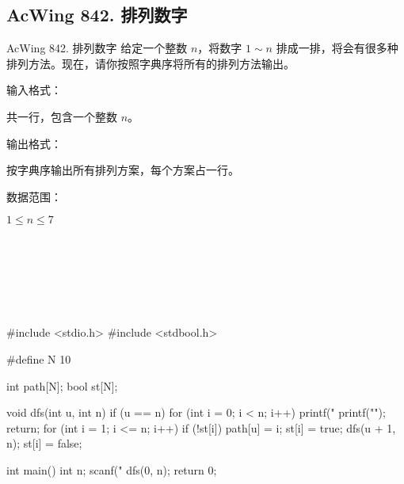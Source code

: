 \subsection{AcWing 842. 排列数字}
\begin{titledbox}{AcWing 842. 排列数字}
    给定一个整数 $n$，将数字 $1 \sim n$ 排成一排，将会有很多种排列方法。现在，请你按照字典序将所有的排列方法输出。

    输入格式：

    共一行，包含一个整数 $n$。

    输出格式：

    按字典序输出所有排列方案，每个方案占一行。

    数据范围：

    $1 \le n \le 7$

    \begin{inputblock}
    \end{inputblock}
    \begin{outputblock}
         \\
         \\
         \\
         \\
         \\
    \end{outputblock}
\end{titledbox}

\begin{mycpptwocol}[排列数字]
    #include <stdio.h>
    #include <stdbool.h>

    #define N 10

    int path[N];
    bool st[N];

    void dfs(int u, int n) {
        if (u == n) {
            for (int i = 0; i < n; i++) {
                printf("%
            }
            printf("\n");
            return;
        }
        for (int i = 1; i <= n; i++) {
            if (!st[i]) {
                path[u] = i;
                st[i] = true;
                dfs(u + 1, n);
                st[i] = false;
            }
        }
    }

    int main() {
        int n;
        scanf("%
        dfs(0, n);
        return 0;
    }
\end{mycpptwocol}

